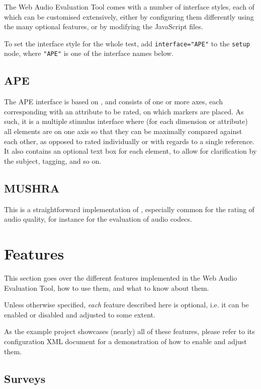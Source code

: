 \documentclass[11pt, oneside]{article}   	%
\begin{document}
	The Web Audio Evaluation Tool comes with a number of interface styles, each of which can be customised extensively, either by configuring them differently using the many optional features, or by modifying the JavaScript files. 

	To set the interface style for the whole test, %
	add \texttt{interface="APE"} to the \texttt{setup} node, where \texttt{"APE"} is one of the interface names below. 

	\subsection{APE}
		The APE interface is based on \cite{ape}, and consists of one or more axes, each corresponding with an attribute to be rated, on which markers are placed. As such, it is a multiple stimulus interface where (for each dimension or attribute) all elements are on one axis so that they can be maximally compared against each other, as opposed to rated individually or with regards to a single reference. 
		It also contains an optional text box for each element, to allow for clarification by the subject, tagging, and so on. 

	\subsection{MUSHRA}
		This is a straightforward implementation of \cite{mushra}, especially common for the rating of audio quality, for instance for the evaluation of audio codecs. 

	
\clearpage

\section{Features}

	This section goes over the different features implemented in the Web Audio Evaluation Tool, how to use them, and what to know about them. 

	Unless otherwise specified, \emph{each} feature described here is optional, i.e. it can be enabled or disabled and adjusted to some extent. 

	As the example project showcases (nearly) all of these features, please refer to its configuration XML document for a demonstration of how to enable and adjust them. 

	\subsection{Surveys}
\end{document}
